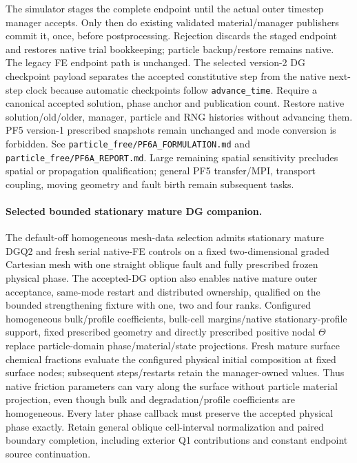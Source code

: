 \documentclass[11pt]{article}
\begin{document}
The simulator stages the complete endpoint until the actual outer timestep
manager accepts. Only then do existing validated material/manager publishers
commit it, once, before postprocessing. Rejection discards the staged endpoint
and restores native trial bookkeeping; particle backup/restore remains native.
The legacy FE endpoint path is unchanged. The selected version-2 DG checkpoint
payload separates the accepted constitutive step from the native next-step clock
because automatic checkpoints follow \texttt{advance\_time}. Require a canonical
accepted solution, phase anchor and publication count. Restore native
solution/old/older, manager, particle and RNG histories without advancing them.
PF5 version-1 prescribed snapshots remain unchanged and mode conversion is
forbidden. See \texttt{particle\_free/PF6A\_FORMULATION.md} and
\texttt{particle\_free/PF6A\_REPORT.md}. Large remaining spatial sensitivity
precludes spatial or propagation qualification; general PF5 transfer/MPI,
transport coupling, moving geometry and fault birth remain subsequent tasks.

\paragraph{Selected bounded stationary mature DG companion.}
The default-off homogeneous mesh-data selection admits stationary mature DGQ2
and fresh serial native-FE controls on a fixed two-dimensional graded Cartesian
mesh with one straight oblique fault and fully prescribed frozen physical phase.
The accepted-DG option also enables native mature outer acceptance, same-mode
restart and distributed ownership, qualified on the bounded strengthening
fixture with one, two and four ranks. Configured homogeneous bulk/profile
coefficients, bulk-cell margins/native stationary-profile support, fixed
prescribed geometry and directly prescribed positive nodal $\Theta$ replace
particle-domain phase/material/state projections. Fresh mature surface chemical
fractions evaluate the configured physical initial composition at fixed surface
nodes; subsequent steps/restarts retain the manager-owned values. Thus native
friction parameters can vary along the surface without particle material
projection, even though bulk and degradation/profile coefficients are homogeneous. Every later phase
callback must preserve the accepted physical phase exactly. Retain general
oblique cell-interval normalization and paired boundary completion, including
exterior Q1 contributions and constant endpoint source continuation.
\end{document}

